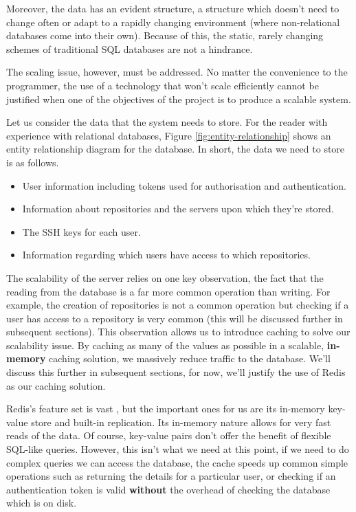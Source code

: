 Moreover, the data has an evident structure, a structure which doesn't need to change often or adapt to a rapidly changing environment (where non-relational databases come into their own). Because of this, the static, rarely changing schemes of traditional SQL databases are not a hindrance. 

The scaling issue, however, must be addressed. No matter the convenience to the programmer, the use of a technology that won't scale efficiently cannot be justified when one of the objectives of the project is to produce a scalable system. 

Let us consider the data that the system needs to store. For the reader with experience with relational databases, Figure \ref{fig:entity-relationship} shows an entity relationship diagram for the database. In short, the data we need to store is as follows.

\begin{itemize}
\item User information including tokens used for authorisation and authentication.
\item Information about repositories and the servers upon which they're stored.
\item The SSH keys for each user.
\item Information regarding which users have access to which repositories.
\end{itemize}


The scalability of the server relies on one key observation, the fact that the reading from the database is a far more common operation than writing. For example, the creation of repositories is not a common operation but checking if a user has access to a repository is very common (this will be discussed further in subsequent sections). This observation allows us to introduce caching to solve our scalability issue. By caching as many of the values as possible in a scalable, \textbf{in-memory} caching solution, we massively reduce traffic to the database. We'll discuss this further in subsequent sections, for now, we'll justify the use of Redis \cite{redis} as our caching solution.

Redis's feature set is vast \cite{redis}, but the important ones for us are its in-memory key-value store and built-in replication. Its in-memory nature allows for very fast reads of the data. Of course, key-value pairs don't offer the benefit of flexible SQL-like queries. However, this isn't what we need at this point, if we need to do complex queries we can access the database, the cache speeds up common simple operations such as returning the details for a particular user, or checking if an authentication token is valid \textbf{without} the overhead of checking the database which is on disk.

